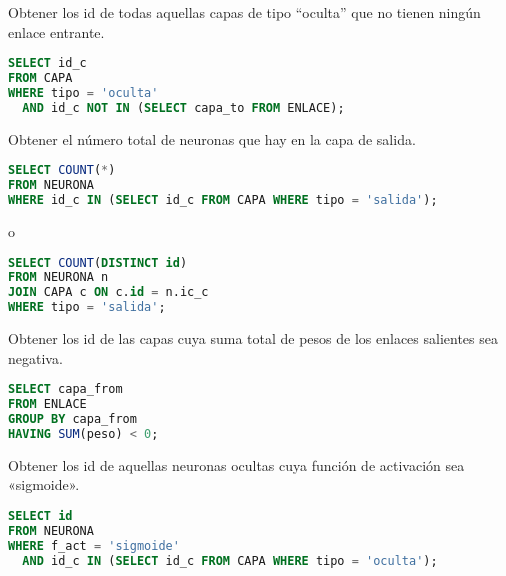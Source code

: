\documentclass[
    12pt,
    a4paper,
    addpoints,
    answers,
    convocatoria=ord,
    titulacion=CD,
    curso=2024/2025,
]{db-exam}
\begin{document}
\begin{questions}
\begin{parts}
\begin{subparts}

\subpart[\half] Obtener los id de todas aquellas capas de tipo \enquote{oculta} que no tienen ningún enlace entrante.

\begin{solution}[6em]

\begin{lstlisting}[language=sql]
SELECT id_c
FROM CAPA
WHERE tipo = 'oculta'
  AND id_c NOT IN (SELECT capa_to FROM ENLACE);
\end{lstlisting}

\end{solution}

\subpart[\half] Obtener el número total de neuronas que hay en la capa de salida.

\begin{solution}[6em]

\begin{lstlisting}[language=sql]
SELECT COUNT(*)
FROM NEURONA
WHERE id_c IN (SELECT id_c FROM CAPA WHERE tipo = 'salida');
\end{lstlisting}

o

\begin{lstlisting}[language=sql]
SELECT COUNT(DISTINCT id)
FROM NEURONA n
JOIN CAPA c ON c.id = n.ic_c
WHERE tipo = 'salida';
\end{lstlisting}

\end{solution}

\subpart[\half] Obtener los id de las capas cuya suma total de pesos de los enlaces salientes sea negativa.

\begin{solution}[6em]

\begin{lstlisting}[language=sql]
SELECT capa_from 
FROM ENLACE 
GROUP BY capa_from 
HAVING SUM(peso) < 0;
\end{lstlisting}

\end{solution}

\subpart[\half] Obtener los id de aquellas neuronas ocultas cuya función de activación sea «sigmoide».

\begin{solution}[6em]

\begin{lstlisting}[language=sql]
SELECT id
FROM NEURONA
WHERE f_act = 'sigmoide'
  AND id_c IN (SELECT id_c FROM CAPA WHERE tipo = 'oculta');
\end{lstlisting}


\end{solution}
\end{subparts}
\end{parts}
\end{questions}
\end{document}

